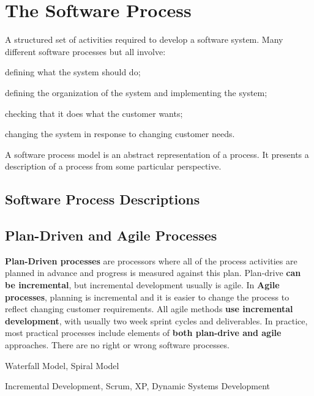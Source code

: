 \documentclass{report}
\begin{document}
\newpage

\newpage
\section{The Software Process}
A structured set of activities required to develop a software system.\newline
Many different software processes but all involve:
\begin{description}
  \setlength\itemsep{-.25em}
  \item [Specification] defining what the system should do;
  \item [Design and implementation] defining the organization of the
system and implementing the system;
  \item [Validation] checking that it does what the customer wants;
  \item [Evolution] changing the system in response to changing
customer needs.
\end{description}
A software process model is an abstract representation of a process. It presents a description of a process from some particular perspective.

\subsection{Software Process Descriptions}

\subsection{Plan-Driven and Agile Processes}
\textbf{Plan-Driven processes} are processors where all of the process activities are planned in advance and progress is measured against this plan. Plan-drive \textbf{can be incremental}, but incremental development usually is agile. In \textbf{Agile processes}, planning is incremental and it is easier to change the process to reflect changing customer requirements. All agile methods \textbf{use incremental development}, with usually two week sprint cycles and deliverables. In practice, most practical processes include elements of \textbf{both plan-drive and agile} approaches. There are no right or wrong software processes.
\begin{description}
  \setlength\itemsep{-.25em}
  \item [Plan-Driven:] Waterfall Model, Spiral Model
  \item [Agile:] Incremental Development, Scrum, XP, Dynamic Systems Development
\end{description}
\end{document}
